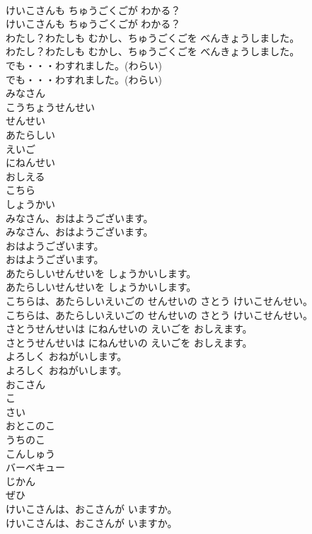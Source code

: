 \documentclass[8pt]{extreport}
\begin{document}
\begin{CJK}{UTF8}{min}
\\	けいこさんも ちゅうごくごが わかる？	
\\	けいこさんも ちゅうごくごが わかる？ 
\\	わたし？わたしも むかし、ちゅうごくごを べんきょうしました。	
\\	わたし？わたしも むかし、ちゅうごくごを べんきょうしました。 
\\	でも・・・わすれました。(わらい)	
\\	でも・・・わすれました。(わらい) 
\\	みなさん
\\	こうちょうせんせい
\\	せんせい
\\	あたらしい
\\	えいご
\\	にねんせい
\\	おしえる
\\	こちら
\\	しょうかい
\\	みなさん、おはようございます。	
\\	みなさん、おはようございます。 
\\	おはようございます。	
\\	おはようございます。 
\\	あたらしいせんせいを しょうかいします。	
\\	あたらしいせんせいを しょうかいします。 
\\	こちらは、あたらしいえいごの せんせいの さとう けいこせんせい。	
\\	こちらは、あたらしいえいごの せんせいの さとう けいこせんせい。 
\\	さとうせんせいは にねんせいの えいごを おしえます。	
\\	さとうせんせいは にねんせいの えいごを おしえます。 
\\	よろしく おねがいします。	
\\	よろしく おねがいします。 
\\	おこさん
\\	こ
\\	さい
\\	おとこのこ
\\	うちのこ
\\	こんしゅう
\\	バーベキュー
\\	じかん
\\	ぜひ
\\	けいこさんは、おこさんが いますか。	
\\	けいこさんは、おこさんが いますか。 

\end{CJK}
\end{document}
